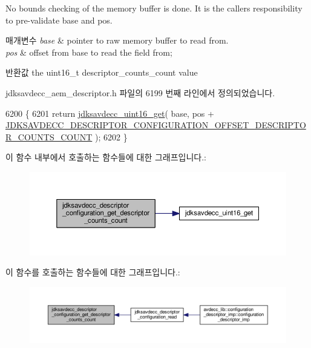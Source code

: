 No bounds checking of the memory buffer is done. It is the caller\textquotesingle{}s responsibility to pre-\/validate base and pos.


\begin{DoxyParams}{매개변수}
{\em base} & pointer to raw memory buffer to read from. \\
\hline
{\em pos} & offset from base to read the field from; \\
\hline
\end{DoxyParams}
\begin{DoxyReturn}{반환값}
the uint16\+\_\+t descriptor\+\_\+counts\+\_\+count value 
\end{DoxyReturn}


jdksavdecc\+\_\+aem\+\_\+descriptor.\+h 파일의 6199 번째 라인에서 정의되었습니다.


\begin{DoxyCode}
6200 \{
6201     \textcolor{keywordflow}{return} \hyperlink{group__endian_ga3fbbbc20be954aa61e039872965b0dc9}{jdksavdecc\_uint16\_get}( base, pos + 
      \hyperlink{group__descriptor__configuration_ga05c1080ec52ae320bd0da203315685ee}{JDKSAVDECC\_DESCRIPTOR\_CONFIGURATION\_OFFSET\_DESCRIPTOR\_COUNTS\_COUNT}
       );
6202 \}
\end{DoxyCode}


이 함수 내부에서 호출하는 함수들에 대한 그래프입니다.\+:
\nopagebreak
\begin{figure}[H]
\begin{center}
\leavevmode
\includegraphics[width=350pt]{group__descriptor__configuration_gad6922158e53499489216fe5842103f98_cgraph}
\end{center}
\end{figure}




이 함수를 호출하는 함수들에 대한 그래프입니다.\+:
\nopagebreak
\begin{figure}[H]
\begin{center}
\leavevmode
\includegraphics[width=350pt]{group__descriptor__configuration_gad6922158e53499489216fe5842103f98_icgraph}
\end{center}
\end{figure}


